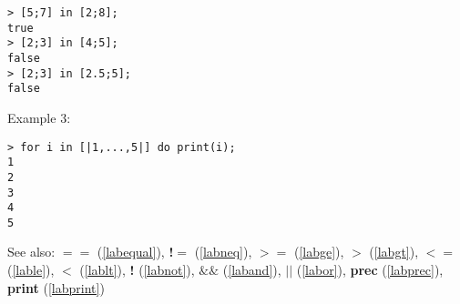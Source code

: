 \begin{center}\begin{minipage}{15cm}\begin{Verbatim}[frame=single]
> [5;7] in [2;8];
true
> [2;3] in [4;5];
false
> [2;3] in [2.5;5];
false
\end{Verbatim}
\end{minipage}\end{center}
\noindent Example 3: 
\begin{center}\begin{minipage}{15cm}\begin{Verbatim}[frame=single]
> for i in [|1,...,5|] do print(i);
1
2
3
4
5
\end{Verbatim}
\end{minipage}\end{center}
See also: \textbf{$==$} (\ref{labequal}), \textbf{!$=$} (\ref{labneq}), \textbf{$>=$} (\ref{labge}), \textbf{$>$} (\ref{labgt}), \textbf{$<=$} (\ref{lable}), \textbf{$<$} (\ref{lablt}), \textbf{!} (\ref{labnot}), \textbf{$\&\&$} (\ref{laband}), \textbf{$||$} (\ref{labor}), \textbf{prec} (\ref{labprec}), \textbf{print} (\ref{labprint})

